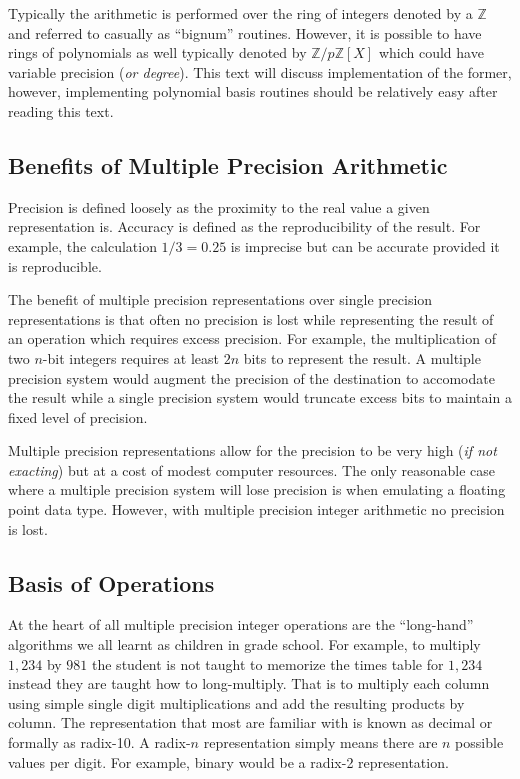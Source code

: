 \documentclass[b5paper]{book}
\def\Z{{\mathbb Z}}
\begin{document}
Typically the arithmetic is performed over the ring of integers denoted by a $\Z$ and referred to casually as ``bignum'' 
routines.  However, it is possible to have rings of polynomials as well typically denoted by $\Z/p\Z \left [ X \right ]$ 
which could have variable precision (\textit{or degree}).  This text will discuss implementation of the former, however,
implementing polynomial basis routines should be relatively easy after reading this text.

\subsection{Benefits of Multiple Precision Arithmetic}
 
Precision is defined loosely as the proximity to the real value a given representation is.  Accuracy is defined as the 
reproducibility of the result.  For example, the calculation $1/3 = 0.25$ is imprecise but can be accurate provided 
it is reproducible.

The benefit of multiple precision representations over single precision representations is that 
often no precision is lost while representing the result of an operation which requires excess precision.  For example, 
the multiplication of two $n$-bit integers requires at least $2n$ bits to represent the result.  A multiple precision 
system would augment the precision of the destination to accomodate the result while a single precision system would
truncate excess bits to maintain a fixed level of precision.

Multiple precision representations allow for the precision to be very high (\textit{if not exacting}) but at a cost of
modest computer resources.  The only reasonable case where a multiple precision system will lose precision is when
emulating a floating point data type.  However, with multiple precision integer arithmetic no precision is lost.

\subsection{Basis of Operations}
At the heart of all multiple precision integer operations are the ``long-hand'' algorithms we all learnt as children 
in grade school.  For example, to multiply $1,234$ by $981$ the student is not taught to memorize the times table for 
$1,234$ instead they are taught how to long-multiply.  That is to multiply each column using simple single digit 
multiplications and add the resulting products by column.  The representation that most are familiar with is known as 
decimal or formally as radix-10. A radix-$n$ representation simply means there are $n$ possible values per digit.  
For example, binary would be a radix-2 representation.
\end{document}
